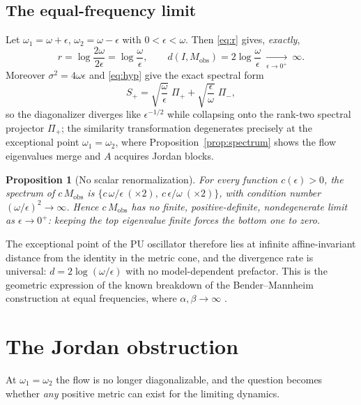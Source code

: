\documentclass[11pt]{article}
\newtheorem{proposition}[theorem]{Proposition}
\theoremstyle{definition}
\theoremstyle{remark}
\newcommand{\w}{\omega}
\newcommand{\Mobs}{M_{\mathrm{obs}}}
\begin{document}
\subsection{The equal-frequency limit}

Let $\w_1=\w+\epsilon$, $\w_2=\w-\epsilon$ with $0<\epsilon<\w$.  Then
\eqref{eq:r} gives, \emph{exactly},
\begin{equation}
r=\log\frac{2\w}{2\epsilon}=\log\frac{\w}{\epsilon},
\qquad
d(I,\Mobs)=2\log\frac{\w}{\epsilon}\ \xrightarrow[\epsilon\to0^+]{}\ \infty .
\end{equation}
Moreover $\sigma^2=4\w\epsilon$ and \eqref{eq:hyp} give the exact spectral
form
\begin{equation}
S_+=\sqrt{\frac{\w}{\epsilon}}\;\Pi_+
+\sqrt{\frac{\epsilon}{\w}}\;\Pi_- ,
\end{equation}
so the diagonalizer diverges like $\epsilon^{-1/2}$ while collapsing onto the
rank-two spectral projector $\Pi_+$; the similarity transformation
degenerates precisely at the exceptional point $\w_1=\w_2$, where
Proposition~\ref{prop:spectrum} shows the flow eigenvalues merge and $A$
acquires Jordan blocks.

\begin{proposition}[No scalar renormalization]\label{prop:noscalar}
For every function $c(\epsilon)>0$, the spectrum of $c\,\Mobs$ is
$\{c\,\w/\epsilon\ (\times2),\ c\,\epsilon/\w\ (\times2)\}$, with condition
number $(\w/\epsilon)^2\to\infty$.  Hence $c\,\Mobs$ has no finite,
positive-definite, nondegenerate limit as $\epsilon\to0^+$: keeping the top
eigenvalue finite forces the bottom one to zero.
\end{proposition}

The exceptional point of the PU oscillator therefore lies at infinite
affine-invariant distance from the identity in the metric cone, and the
divergence rate is universal: $d=2\log(\w/\epsilon)$ with no
model-dependent prefactor.  This is the geometric expression of the known
breakdown of the Bender--Mannheim construction at equal frequencies, where
$\alpha,\beta\to\infty$ \cite{BM2008PRD}.

\section{The Jordan obstruction}\label{sec:jordan}

At $\w_1=\w_2$ the flow is no longer diagonalizable, and the question becomes
whether \emph{any} positive metric can exist for the limiting dynamics.
\end{document}
